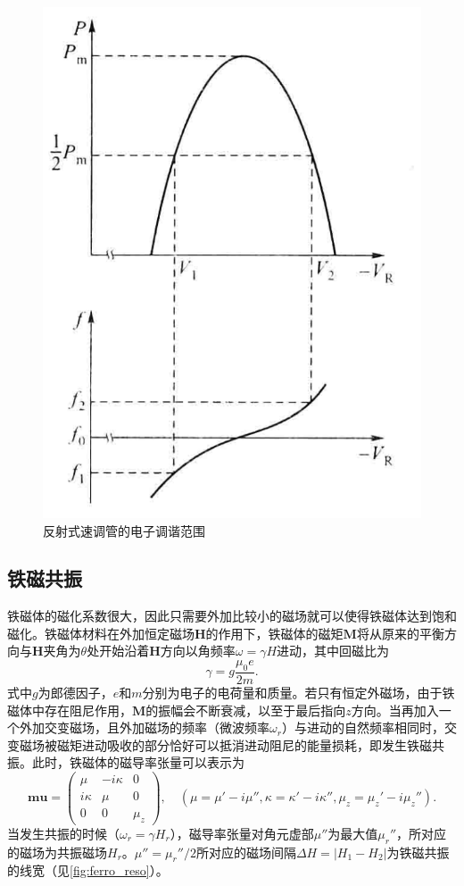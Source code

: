 \documentclass[font=default]{mpltx}
\begin{document}
\begin{figure}[h]
\begin{minipage}[t]{0.33\textwidth}
    \includegraphics[width=\textwidth]{fig/elec_tuning.png}
    \caption{反射式速调管的电子调谐范围}
    \label{fig:elec_tuning}
  \end{minipage}
\end{figure}

\subsection{铁磁共振}
铁磁体的磁化系数很大，因此只需要外加比较小的磁场就可以使得铁磁体达到饱和磁化。铁磁体材料在外加恒定磁场$\bm{H}$的作用下，铁磁体的磁矩$\bm{M}$将从原来的平衡方向与$\bm{H}$夹角为$\theta$处开始沿着$\bm{H}$方向以角频率$\omega=\gamma H$进动，其中回磁比为$$\gamma=g\frac{\mu_0e}{2m}.$$式中$g$为郎德因子，$e$和$m$分别为电子的电荷量和质量。若只有恒定外磁场，由于铁磁体中存在阻尼作用，$\bm{M}$的振幅会不断衰减，以至于最后指向$z$方向。当再加入一个外加交变磁场，且外加磁场的频率（微波频率$\omega_r$）与进动的自然频率相同时，交变磁场被磁矩进动吸收的部分恰好可以抵消进动阻尼的能量损耗，即发生铁磁共振。此时，铁磁体的磁导率张量可以表示为
$$
\bm{mu}=\begin{pmatrix}
  \mu & -i\kappa & 0\\
  i\kappa & \mu & 0\\
  0 & 0 & \mu_{z}
\end{pmatrix},\quad (\mu=\mu'-i\mu'',\kappa=\kappa'-i\kappa'',\mu_z=\mu_z'-i\mu_z'').
$$
当发生共振的时候（$\omega_r=\gamma H_r$），磁导率张量对角元虚部$\mu''$为最大值$\mu_r''$，所对应的磁场为共振磁场$H_r$。$\mu''=\mu_r''/2$所对应的磁场间隔$\Delta H=|H_1-H_2|$为铁磁共振的线宽（见\autoref{fig:ferro_reso}）。
\end{document}
